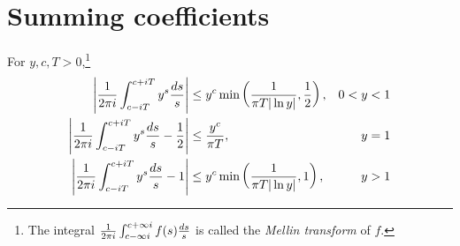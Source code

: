 \section{Summing coefficients}
\begin{lem}
For $y,c,T>0$,\footnote{The integral $\frac{1}{2\pi i}\int_{c-\infty i}^{c+\infty i} f(s)\frac{ds}s$ is called the {\it Mellin transform} of $f$.}
\begin{align*}
\left| {\frac{1}{2\pi i} \int_{c-iT}^{c+iT} y^s\frac{ds}s} \right|&\le y^c\min\left( {\frac{1}{\pi T|\ln y|},\frac{1}{2}} \right),&0<y<1\\
\left| {\frac{1}{2\pi i} \int_{c-iT}^{c+iT} y^s\frac{ds}s-\frac{1}{2}} \right|&\le \frac{y^c}{\pi T},&y=1\\
\left| {\frac{1}{2\pi i} \int_{c-iT}^{c+iT} y^s\frac{ds}s-1} \right|&\le y^c\min\left( {\frac{1}{\pi T|\ln y|},1} \right),&y>1
\end{align*}
\end{lem}
